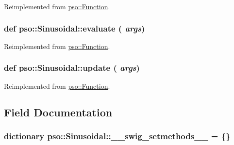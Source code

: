 Reimplemented from \hyperlink{classpso_1_1Function_c80bd40fcf4a956e5732ed099bccc598}{pso::Function}.\hypertarget{classpso_1_1Sinusoidal_4c9e94b27d920bbee7cb3fc8ac4c09c7}{
\subsubsection{\setlength{\rightskip}{0pt plus 5cm}def pso::Sinusoidal::evaluate ( {\em args})}}
\label{classpso_1_1Sinusoidal_4c9e94b27d920bbee7cb3fc8ac4c09c7}




Reimplemented from \hyperlink{classpso_1_1Function_7c958ea6d942a89ae219b872b4d73541}{pso::Function}.\hypertarget{classpso_1_1Sinusoidal_56ebee67a884bc171cddea452bf12f2e}{
\subsubsection{\setlength{\rightskip}{0pt plus 5cm}def pso::Sinusoidal::update ( {\em args})}}
\label{classpso_1_1Sinusoidal_56ebee67a884bc171cddea452bf12f2e}




Reimplemented from \hyperlink{classpso_1_1Function_95ef0ee896d9855495cb2518c368fecf}{pso::Function}.

\subsection{Field Documentation}
\hypertarget{classpso_1_1Sinusoidal_7bdd3d830dd4d4cbe4481f4ac2f2db41}{
\subsubsection{\setlength{\rightskip}{0pt plus 5cm}dictionary {\bf pso::Sinusoidal::\_\-\_\-swig\_\-setmethods\_\-\_\-} = \{\}}}
\label{classpso_1_1Sinusoidal_7bdd3d830dd4d4cbe4481f4ac2f2db41}




